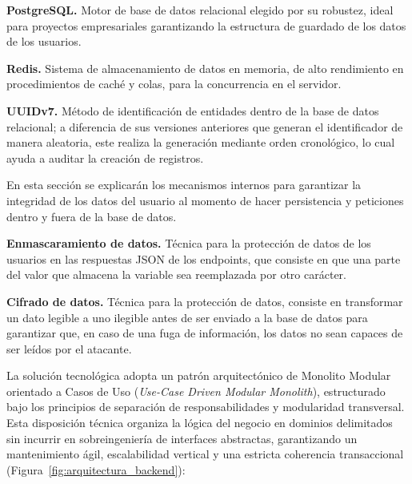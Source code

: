 \textbf{PostgreSQL.} Motor de base de datos relacional elegido por su robustez, 
    ideal para proyectos empresariales garantizando la estructura de guardado de los datos de los usuarios. \par

\textbf{Redis.} Sistema de almacenamiento de datos en memoria, 
    de alto rendimiento en procedimientos de caché y colas, para la concurrencia en el servidor. \par

\textbf{UUIDv7.} Método de identificación de entidades dentro de la base de datos relacional; 
    a diferencia de sus versiones anteriores que generan el identificador de manera aleatoria, 
    este realiza la generación mediante orden cronológico, lo cual ayuda a auditar la creación de registros. \par

En esta sección se explicarán los mecanismos internos para garantizar la integridad de los datos del usuario al momento de hacer persistencia 
y peticiones dentro y fuera de la base de datos.

\textbf{Enmascaramiento de datos.} Técnica para la protección de datos de los usuarios en las respuestas JSON de los endpoints, 
    que consiste en que una parte del valor que almacena la variable sea reemplazada por otro carácter. \par

\textbf{Cifrado de datos.} Técnica para la protección de datos, consiste en transformar un dato legible a uno ilegible antes de ser enviado 
    a la base de datos para garantizar que, en caso de una fuga de información, los datos no sean capaces de ser leídos por el atacante.


La solución tecnológica adopta un patrón arquitectónico de Monolito Modular orientado a Casos de Uso (\textit{Use-Case Driven Modular Monolith}), 
estructurado bajo los principios de separación de responsabilidades y modularidad transversal. 
Esta disposición técnica organiza la lógica del negocio en dominios delimitados sin incurrir en sobreingeniería de interfaces abstractas, 
garantizando un mantenimiento ágil, escalabilidad vertical y una estricta coherencia transaccional (Figura~\ref{fig:arquitectura_backend}):

